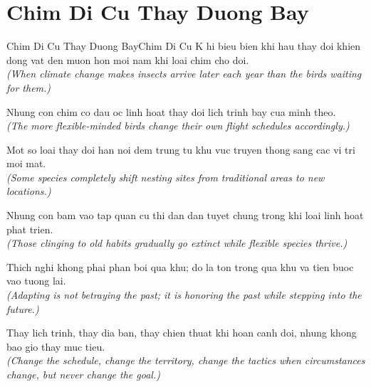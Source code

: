 \section{Chim Di Cu Thay Duong Bay}
\begin{truyen}{Chim Di Cu Thay Duong Bay}{Chim Di Cu}
K hi bieu bien khi hau thay doi khien dong vat den muon hon moi nam khi loai chim cho doi.\\
\textit{(When climate change makes insects arrive later each year than the birds waiting for them.)}

Nhung con chim co dau oc linh hoat thay doi lich trinh bay cua minh theo.\\
\textit{(The more flexible-minded birds change their own flight schedules accordingly.)}

Mot so loai thay doi han noi dem trung tu khu vuc truyen thong sang cac vi tri moi mat.\\
\textit{(Some species completely shift nesting sites from traditional areas to new locations.)}

Nhung con bam vao tap quan cu thi dan dan tuyet chung trong khi loai linh hoat phat trien.\\
\textit{(Those clinging to old habits gradually go extinct while flexible species thrive.)}

Thich nghi khong phai phan boi qua khu; do la ton trong qua khu va tien buoc vao tuong lai.\\
\textit{(Adapting is not betraying the past; it is honoring the past while stepping into the future.)}

\end{truyen}
\begin{baihoc}
  Thay lich trinh, thay dia ban, thay chien thuat khi hoan canh doi, nhung khong bao gio thay muc tieu.\\
  \textit{(Change the schedule, change the territory, change the tactics when circumstances change, but never change the goal.)}
\end{baihoc}

